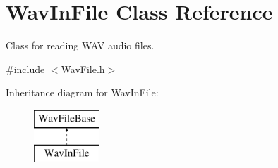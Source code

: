 \hypertarget{class_wav_in_file}{}\section{Wav\+In\+File Class Reference}
\label{class_wav_in_file}


Class for reading W\+AV audio files.  




{\ttfamily \#include $<$Wav\+File.\+h$>$}

Inheritance diagram for Wav\+In\+File\+:\begin{figure}[H]
\begin{center}
\leavevmode
\includegraphics[height=2.000000cm]{class_wav_in_file}
\end{center}
\end{figure}
